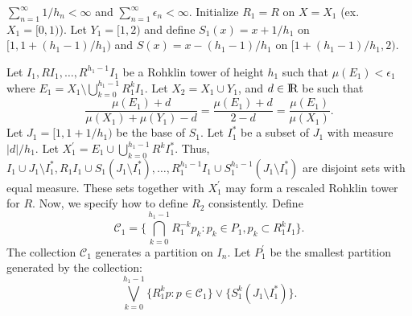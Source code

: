\documentclass[12pt]{amsart}
\begin{document}
\noindent 
$\sum_{n=1}^{\infty}{1}/{h_n} < \infty$ and $\sum_{n=1}^{\infty}\epsilon_n < \infty$. 
Initialize $R_1 = R$ on $X=X_1$ (ex. $X_1 = [0,1)$).  
Let $Y_1=[1,2)$ and define $S_1(x) = x + {1} / {h_1}$ on $[1,1 + {(h_1 - 1)}/{h_1})$ 
and $S(x)=x - {(h_1-1)} / {h_1}$ on $[1 + {(h_1-1)}/{h_1},2)$. 

Let $I_1, RI_1, \ldots ,R^{h_1-1}I_1$ be a Rohklin tower of height $h_1$ such that 
$\mu(E_1) < \epsilon_1$ where $E_1 = X_1\setminus \bigcup_{k=0}^{h_1-1}R_1 ^kI_1$. 
Let $X_2 = X_1 \cup Y_1$, and $d\in {\hbox{\rm\setbox1=\hbox{I}\copy1\kern-.45\wd1 R}}$ be such that 
\[
\frac{\mu(E_1) + d }{\mu(X_1)+\mu(Y_1)-d} = \frac{\mu(E_1) + d }{2 - d} = \frac{\mu(E_1)}{\mu(X_1)} .
\]
Let $J_1=[1, 1 + {1} / {h_1})$ be the base of $S_1$. 
Let $I_1^*$ be a subset of $J_1$ with measure ${ \vert d \vert } / {h_1}$. 
Let $X_1^{\prime} = E_1 \cup \bigcup_{k=0}^{h_1-1}R^k I_1^*$. 
Thus, $I_1\cup J_1 \setminus I_1^*, R_1 I_1 \cup S_1 (J_1 \setminus I_1^*), \ldots ,
R_1^{h_1-1} I_1 \cup S_1^{h_1-1} (J_1 \setminus I_1^*)$ are disjoint sets with equal measure. 
These sets together with $X_1^{\prime}$ may form a rescaled Rohklin tower for $R$. 
Now, we specify how to define $R_2$ consistently. 
Define 
\[
\mathcal{C}_1=\{ \bigcap_{k=0}^{h_1-1} R_1^{-k} p_k : p_k\in P_1, p_k\subset R_1^{k}I_1 \} . 
\]
The collection $\mathcal{C}_1$ generates a partition on $I_n$.  Let $P_{1}^{\prime}$ be the smallest 
partition generated by the collection:
\[
\bigvee_{k=0}^{h_1-1} \{ R_1^{k} p : p\in \mathcal{C}_1 \} \vee \{ S_1^k (J_1\setminus I_1^*) \} . 
\] 
\end{document}
